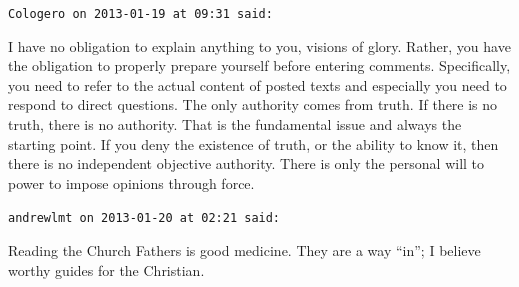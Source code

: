 \begin{footnotesize}
\begin{sffamily}
\hfill

\texttt{Cologero on 2013-01-19 at 09:31 said:}

I have no obligation to explain anything to you, visions of glory. Rather, you have the obligation to properly prepare yourself before entering comments. Specifically, you need to refer to the actual content of posted texts and especially you need to respond to direct questions. The only authority comes from truth. If there is no truth, there is no authority. That is the fundamental issue and always the starting point. If you deny the existence of truth, or the ability to know it, then there is no independent objective authority. There is only the personal will to power to impose opinions through force.

\hfill

\texttt{andrewlmt on 2013-01-20 at 02:21 said:}

Reading the Church Fathers is good medicine. They are a way ``in''; I believe worthy guides for the Christian.

\hfill

\end{sffamily}
\end{footnotesize}


